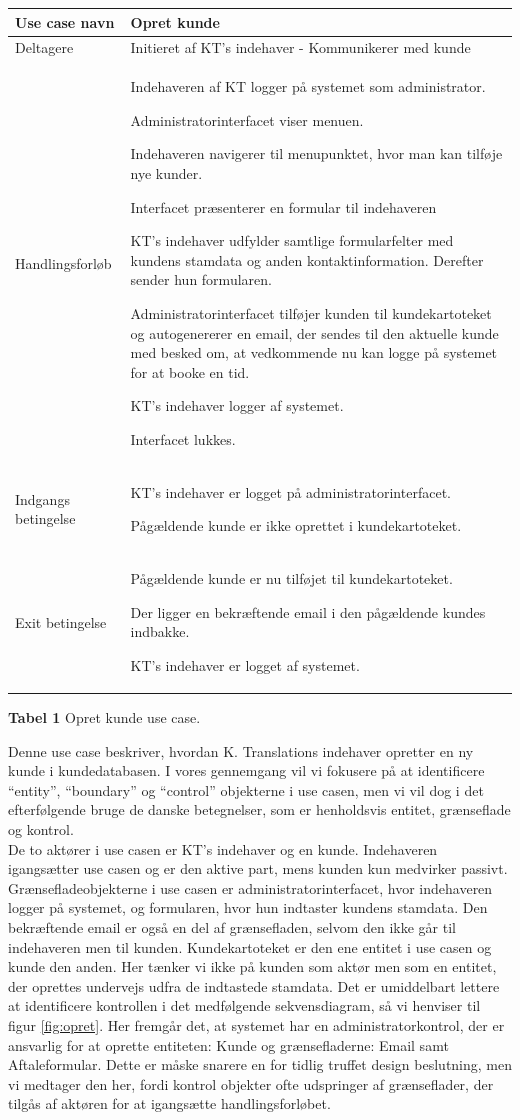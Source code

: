\documentclass[12pt]{article}   %
\newcommand{\nextitem}{\par\hspace*{\labelsep}\textbullet\hspace*{\labelsep}}
\begin{document}
\begin{tabular}{l p{10cm}}
Use case navn & Opret kunde \\ \hline
Deltagere & \nextitem Initieret af KT's indehaver -
             Kommunikerer med kunde \\ \hline
Handlingsforløb &
	\nextitem Indehaveren af KT logger på systemet som administrator. 
	\nextitem Administratorinterfacet viser menuen.
	\nextitem Indehaveren navigerer til menupunktet, hvor man kan tilføje nye
		kunder.
		\nextitem Interfacet præsenterer en formular til indehaveren
	\nextitem KT's indehaver udfylder samtlige formularfelter med
		kundens stamdata og anden kontaktinformation. Derefter
		sender hun formularen.		
	\nextitem Administratorinterfacet tilføjer kunden til kundekartoteket
	og autogenererer en email, der sendes til den aktuelle kunde
		med besked om, at vedkommende nu kan logge på systemet for at
		booke en tid.
	\nextitem KT's indehaver logger af systemet. 
	\nextitem Interfacet lukkes.
	\\ \hline
	Indgangs betingelse &
		\nextitem KT's indehaver er logget på administratorinterfacet. 
		\nextitem Pågældende kunde er ikke oprettet i kundekartoteket. 
		\\ \hline
Exit betingelse & 
	\nextitem Pågældende kunde er nu tilføjet til
			kundekartoteket.
		\nextitem Der ligger en bekræftende email i den pågældende kundes
			indbakke.
		\nextitem KT's indehaver er logget af systemet.\\ \hline
\end{tabular}
\begin{center}
\textbf{Tabel 1} Opret kunde use case.
\end{center}
\vspace{0.5cm}

Denne use case beskriver, hvordan K. Translations indehaver opretter en ny kunde i kundedatabasen. I vores gennemgang vil vi fokusere på at identificere ``entity'', ``boundary'' og ``control'' objekterne i use casen, men vi vil dog i det efterfølgende bruge de danske betegnelser, som er henholdsvis entitet, grænseflade og kontrol. \\
De to aktører i use casen er KT's indehaver og en kunde. Indehaveren igangsætter use casen og er den aktive part, mens kunden kun medvirker passivt. Grænsefladeobjekterne i use casen er administratorinterfacet, hvor indehaveren
logger på systemet, og formularen, hvor hun indtaster kundens stamdata. Den bekræftende email er også en del af grænsefladen, selvom den ikke går til 
indehaveren men til kunden. Kundekartoteket er den ene entitet i use casen og kunde den anden. Her tænker vi ikke på kunden som aktør men som en entitet, der oprettes undervejs udfra de indtastede stamdata. Det er umiddelbart
lettere at identificere kontrollen i det medfølgende sekvensdiagram, så vi henviser til figur \ref{fig:opret}. Her fremgår det, at systemet har en administratorkontrol, der er ansvarlig for at oprette entiteten: Kunde og
grænsefladerne: Email samt Aftaleformular. Dette er måske snarere en for tidlig truffet design beslutning, men vi medtager den her, fordi kontrol objekter ofte udspringer af grænseflader, der tilgås af aktøren for at igangsætte 
handlingsforløbet.    
\end{document}
